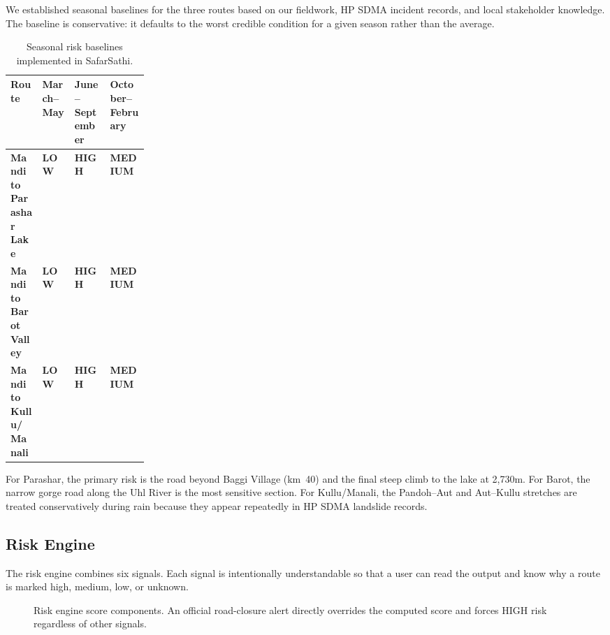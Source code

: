 \documentclass[12pt,a4paper]{article}
\newcommand{\risklow}{\cellcolor{lightgreen}\textbf{LOW}}
\newcommand{\riskmed}{\cellcolor{lightyellow}\textbf{MEDIUM}}
\newcommand{\riskhigh}{\cellcolor{lightred}\textbf{HIGH}}
\begin{document}
We established seasonal baselines for the three routes based on our fieldwork, HP SDMA incident records, and local stakeholder knowledge. The baseline is conservative: it defaults to the worst credible condition for a given season rather than the average.

\begin{table}[H]
  \centering
  \caption{Seasonal risk baselines implemented in SafarSathi.}
  \label{tab:seasonal}
  \begin{tabularx}{\linewidth}{>{\bfseries}p{0.23\linewidth}XXX}
    \toprule
    Route & March--May & June--September & October--February\\
    \midrule
    Mandi to Parashar Lake & \risklow & \riskhigh & \riskmed\\
    Mandi to Barot Valley  & \risklow & \riskhigh & \riskmed\\
    Mandi to Kullu/Manali  & \risklow & \riskhigh & \riskmed\\
    \bottomrule
  \end{tabularx}
\end{table}

For Parashar, the primary risk is the road beyond Baggi Village (km~40) and the final steep climb to the lake at 2,730m. For Barot, the narrow gorge road along the Uhl River is the most sensitive section. For Kullu/Manali, the Pandoh--Aut and Aut--Kullu stretches are treated conservatively during rain because they appear repeatedly in HP SDMA landslide records.

\subsection{Risk Engine}

The risk engine combines six signals. Each signal is intentionally understandable so that a user can read the output and know why a route is marked high, medium, low, or unknown.

\begin{figure}[H]
  \centering
  \caption{Risk engine score components. An official road-closure alert directly overrides the computed score and forces HIGH risk regardless of other signals.}
  \label{fig:riskcomponents}
\end{figure}
\end{document}
